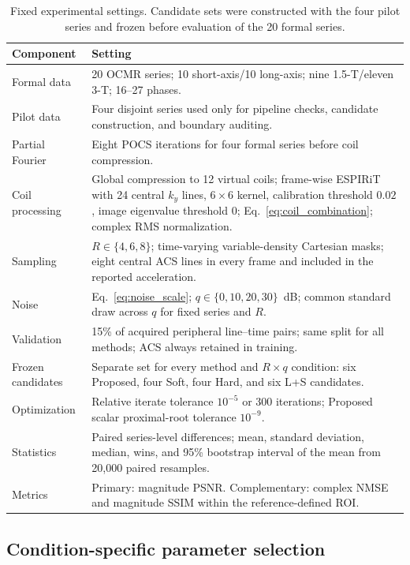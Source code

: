 \begin{table}[t]
\centering
\caption{Fixed experimental settings. Candidate sets were constructed with the four pilot series and frozen before evaluation of the 20 formal series.}
\label{tab:experimental_settings}
\small
\renewcommand{\arraystretch}{1.08}
\begin{tabular}{p{}p{}}
\toprule
Component & Setting \\
\midrule
Formal data & 20 OCMR series; 10 short-axis/10 long-axis; nine 1.5-T/eleven 3-T; 16--27 phases. \\
Pilot data & Four disjoint series used only for pipeline checks, candidate construction, and boundary auditing. \\
Partial Fourier & Eight POCS iterations for four formal series before coil compression. \\
Coil processing & Global compression to 12 virtual coils; frame-wise ESPIRiT with 24 central $k_y$ lines, $6\times6$ kernel, calibration threshold $0.02$, image eigenvalue threshold $0$; Eq.~\eqref{eq:coil_combination}; complex RMS normalization. \\
Sampling & $R\in\{4,6,8\}$; time-varying variable-density Cartesian masks; eight central ACS lines in every frame and included in the reported acceleration. \\
Noise & Eq.~\eqref{eq:noise_scale}; $q\in\{0,10,20,30\}$~dB; common standard draw across $q$ for fixed series and $R$. \\
Validation & 15\% of acquired peripheral line--time pairs; same split for all methods; ACS always retained in training. \\
Frozen candidates & Separate set for every method and $R\times q$ condition: six Proposed, four Soft, four Hard, and six L+S candidates. \\
Optimization & Relative iterate tolerance $10^{-5}$ or 300 iterations; Proposed scalar proximal-root tolerance $10^{-9}$. \\
Statistics & Paired series-level differences; mean, standard deviation, median, wins, and 95\% bootstrap interval of the mean from 20,000 paired resamples. \\
Metrics & Primary: magnitude PSNR. Complementary: complex NMSE and magnitude SSIM within the reference-defined ROI. \\
\bottomrule
\end{tabular}
\end{table}

\subsection{Condition-specific parameter selection}
\label{sec:parameter_selection}

